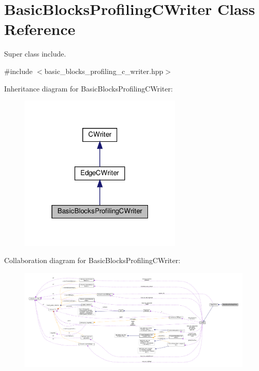 \hypertarget{classBasicBlocksProfilingCWriter}{}\section{Basic\+Blocks\+Profiling\+C\+Writer Class Reference}
\label{classBasicBlocksProfilingCWriter}


Super class include.  




{\ttfamily \#include $<$basic\+\_\+blocks\+\_\+profiling\+\_\+c\+\_\+writer.\+hpp$>$}



Inheritance diagram for Basic\+Blocks\+Profiling\+C\+Writer\+:
\nopagebreak
\begin{figure}[H]
\begin{center}
\leavevmode
\includegraphics[width=220pt]{de/d96/classBasicBlocksProfilingCWriter__inherit__graph}
\end{center}
\end{figure}


Collaboration diagram for Basic\+Blocks\+Profiling\+C\+Writer\+:
\nopagebreak
\begin{figure}[H]
\begin{center}
\leavevmode
\includegraphics[width=350pt]{d4/dda/classBasicBlocksProfilingCWriter__coll__graph}
\end{center}
\end{figure}
